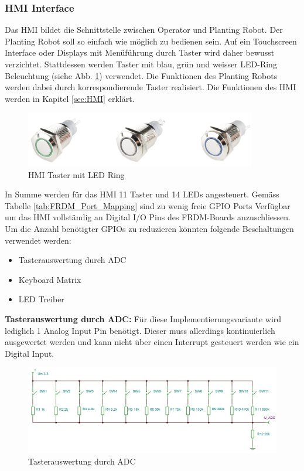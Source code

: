 \subsubsection{HMI Interface} \label{sec:Mainboard_HMI_Interface}
Das HMI bildet die Schnittstelle zwischen Operator und Planting Robot. Der Planting Robot soll so einfach wie möglich zu bedienen sein. Auf ein Touchscreen Interface oder Displays mit Menüführung durch Taster wird daher bewusst verzichtet. Stattdessen werden Taster mit blau, grün und weisser LED-Ring Beleuchtung (siehe Abb. \ref{fig:Taster_LED-Ring}) verwendet. Die Funktionen des Planting Robots werden dabei durch korrespondierende Taster realisiert. Die Funktionen des HMI werden in Kapitel \ref{sec:HMI} erklärt.
\begin{figure}[H]
	\includegraphics[width=0.9\textwidth]{Illustrationen/6-Umsetzung/HMI_LED_Taster.png}
	\caption{HMI Taster mit LED Ring\protect\cite{HMI_Taster}}
	\label{fig:Taster_LED-Ring}
\end{figure}

In Summe werden für das HMI 11 Taster und 14 LEDs angesteuert. Gemäss Tabelle \ref{tab:FRDM_Port_Mapping} sind zu wenig freie GPIO Ports Verfügbar um das HMI vollständig an Digital I/O Pins des FRDM-Boards anzuschliessen. Um die Anzahl benötigter GPIOs zu reduzieren könnten folgende Beschaltungen verwendet werden:
\begin{itemize}
	\item Tasterauswertung durch ADC
	\item Keyboard Matrix
	\item LED Treiber
\end{itemize}

\textbf{Tasterauswertung durch ADC:} Für diese Implementierungsvariante wird lediglich 1 Analog Input Pin benötigt. Dieser muss allerdings kontinuierlich ausgewertet werden und kann nicht über einen Interrupt gesteuert werden wie ein Digital Input.

\begin{figure}[H]
	\includegraphics[width=1\textwidth]{Illustrationen/6-Umsetzung/Spannungsteiler_ADC.png}
	\caption{Tasterauswertung durch ADC}
	\label{fig:Spannungsteiler_ADC}
\end{figure}

